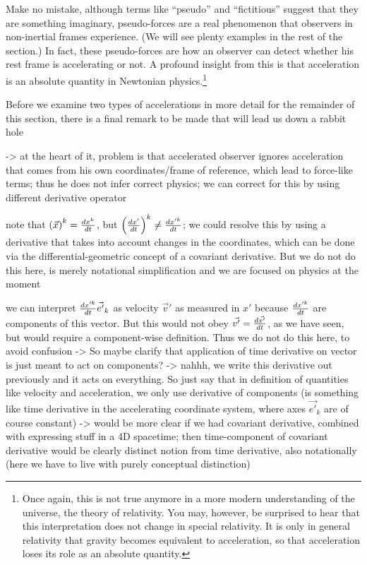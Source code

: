 \documentclass[../class_mech_main.tex]{subfiles}
\begin{document}
Make no mistake, although terms like \enquote{pseudo} and \enquote{fictitious} suggest that they are something imaginary, pseudo-forces are a real phenomenon that observers in non-inertial frames experience. (We will see plenty examples in the rest of the section.) In fact, these pseudo-forces are how an observer can detect whether his rest frame is accelerating or not. A profound insight from this is that acceleration is an absolute quantity in Newtonian physics.\footnote{Once again, this is not true anymore in a more modern understanding of the universe, the theory of relativity. You may, however, be surprised to hear that this interpretation does not change in special relativity. It is only in general relativity that gravity becomes equivalent to acceleration, so that acceleration loses its role as an absolute quantity.}



Before we examine two types of accelerations in more detail for the remainder of this section, there is a final remark to be made that will lead us down a rabbit hole

-> at the heart of it, problem is that accelerated observer ignores acceleration that comes from his own coordinates/frame of reference, which lead to force-like terms; thus he does not infer correct physics; we can correct for this by using different derivative operator

note that $\qty(\vec{x})^k = \dv{x^k}{t}$, but $\qty(\dv{x'}{t})^k \neq \dv{x'^k}{t}$; we could resolve this by using a derivative that takes into account changes in the coordinates, which can be done via the differential-geometric concept of a covariant derivative. But we do not do this here, is merely notational simplification and we are focused on physics at the moment


we can interpret $\dv{x'^k}{t} \vec{e'}_k$ as velocity $\vec{v}'$ as measured in $x'$ because $\dv{x'^k}{t}$ are components of this vector. But this would not obey $\vec{v'} = \dv{\vec{x'}}{t}$, as we have seen, but would require a component-wise definition. Thus we do not do this here, to avoid confusion  -> So maybe clarify that application of time derivative on vector is just meant to act on components? -> nahhh, we write this derivative out previously and it acts on everything. So just say that in definition of quantities like velocity and acceleration, we only use derivative of components (is something like time derivative in the accelerating coordinate system, where axes $\vec{e'}_k$ are of course constant) -> would be more clear if we had covariant derivative, combined with expressing stuff in a 4D spacetime; then time-component of covariant derivative would be clearly distinct notion from time derivative, also notationally (here we have to live with purely conceptual distinction)
\end{document}
